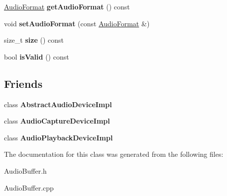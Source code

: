 \begin{DoxyCompactItemize}
\item 
\hypertarget{class_audio_d_x_1_1_audio_buffer_a38f80f5a3375f8c2dd15a667a6d543f3}{\hyperlink{struct_audio_d_x_1_1_audio_format}{Audio\-Format} {\bfseries get\-Audio\-Format} () const }\label{class_audio_d_x_1_1_audio_buffer_a38f80f5a3375f8c2dd15a667a6d543f3}

\item 
\hypertarget{class_audio_d_x_1_1_audio_buffer_ae97979750593e23bf1ff3b25d9eb0dac}{void {\bfseries set\-Audio\-Format} (const \hyperlink{struct_audio_d_x_1_1_audio_format}{Audio\-Format} \&)}\label{class_audio_d_x_1_1_audio_buffer_ae97979750593e23bf1ff3b25d9eb0dac}

\item 
\hypertarget{class_audio_d_x_1_1_audio_buffer_af7c14444d7a9435efdebab88ac186558}{size\-\_\-t {\bfseries size} () const }\label{class_audio_d_x_1_1_audio_buffer_af7c14444d7a9435efdebab88ac186558}

\item 
\hypertarget{class_audio_d_x_1_1_audio_buffer_a2a4cadb069218fd60858015919486f5f}{bool {\bfseries is\-Valid} () const }\label{class_audio_d_x_1_1_audio_buffer_a2a4cadb069218fd60858015919486f5f}

\end{DoxyCompactItemize}
\subsection*{Friends}
\begin{DoxyCompactItemize}
\item 
\hypertarget{class_audio_d_x_1_1_audio_buffer_a8170f13a37c389a8e0a803b8250672f6}{class {\bfseries Abstract\-Audio\-Device\-Impl}}\label{class_audio_d_x_1_1_audio_buffer_a8170f13a37c389a8e0a803b8250672f6}

\item 
\hypertarget{class_audio_d_x_1_1_audio_buffer_a7add6a09c25568894e169e5135d58496}{class {\bfseries Audio\-Capture\-Device\-Impl}}\label{class_audio_d_x_1_1_audio_buffer_a7add6a09c25568894e169e5135d58496}

\item 
\hypertarget{class_audio_d_x_1_1_audio_buffer_a084ec92aa628d9c1cb5bb72ac0675eae}{class {\bfseries Audio\-Playback\-Device\-Impl}}\label{class_audio_d_x_1_1_audio_buffer_a084ec92aa628d9c1cb5bb72ac0675eae}

\end{DoxyCompactItemize}


The documentation for this class was generated from the following files\-:\begin{DoxyCompactItemize}
\item 
Audio\-Buffer.\-h\item 
Audio\-Buffer.\-cpp\end{DoxyCompactItemize}
